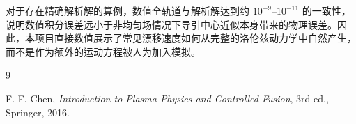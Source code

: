 \documentclass[UTF8,11pt,a4paper]{ctexart}
\begin{document}
对于存在精确解析解的算例，数值全轨道与解析解达到约 $10^{-9}$--$10^{-11}$ 的一致性，说明数值积分误差远小于非均匀场情况下导引中心近似本身带来的物理误差。因此，本项目直接数值展示了常见漂移速度如何从完整的洛伦兹动力学中自然产生，而不是作为额外的运动方程被人为加入模拟。

\begin{thebibliography}{9}

F. F. Chen,
\textit{Introduction to Plasma Physics and Controlled Fusion},
3rd ed., Springer, 2016.

\end{thebibliography}
\end{document}
